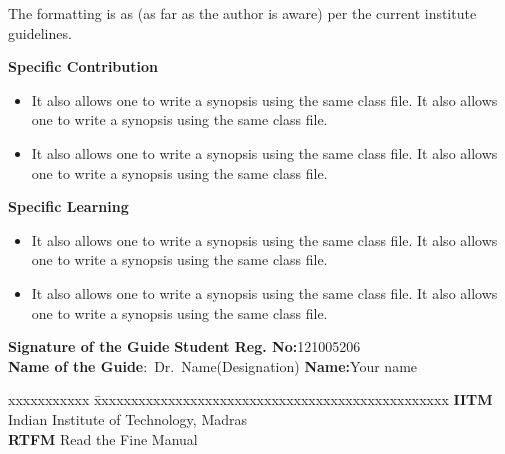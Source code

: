 \documentclass[a4paper, 12pt, oneside]{sastra}
\begin{document}
	The formatting is as (as far as the author is aware) per the current institute guidelines.
	
	\noindent \textbf{Specific Contribution}
	\begin{itemize}
		\item It also allows one to write a synopsis using the same class file. It also allows one to write a synopsis using the same class file.
		\item It also allows one to write a synopsis using the same class file. It also allows one to write a synopsis using the same class file.
	\end{itemize}
	\noindent \textbf{Specific Learning}
	\begin{itemize}
		\item It also allows one to write a synopsis using the same class file. It also allows one to write a synopsis using the same class file.
		\item It also allows one to write a synopsis using the same class file. It also allows one to write a synopsis using the same class file.
	\end{itemize}
	
	\vspace*{24pt}
	
	\noindent \textbf{Signature of the Guide} \hspace*{70mm} \textbf{Student Reg. No:}121005206\\
	\noindent \textbf{Name of the Guide}:~Dr.~Name(Designation) \hspace*{35mm} \textbf{Name:}Your name
	\pagebreak
	
	
	
	\begin{singlespace}
		\tableofcontents
		\thispagestyle{empty}
		
		
		\listoffigures
		\listoftables
	\end{singlespace}
	
	
	\abbreviations
	
	\noindent 
	\begin{tabbing}
		xxxxxxxxxxx \= xxxxxxxxxxxxxxxxxxxxxxxxxxxxxxxxxxxxxxxxxxxxxxxx \kill
		\textbf{IITM}   \> Indian Institute of Technology, Madras \\
		\textbf{RTFM} \> Read the Fine Manual \\
	\end{tabbing}
	
\end{document}
